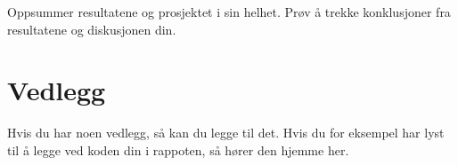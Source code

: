 \documentclass[a4paper,10pt]{article}
\begin{document}
Oppsummer resultatene og prosjektet i sin helhet. Prøv å trekke konklusjoner fra resultatene og diskusjonen din. 


\appendix 
\section{Vedlegg}

Hvis du har noen vedlegg, så kan du legge til det. Hvis du for eksempel har lyst til å legge ved koden din i rappoten, så hører den hjemme her. 
\end{document}
